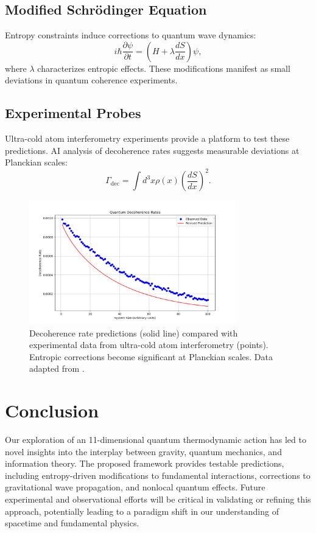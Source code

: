 \documentclass[12pt]{article}
\begin{document}
\subsection{Modified Schrödinger Equation}
Entropy constraints induce corrections to quantum wave dynamics:
\begin{equation}
i \hbar \frac{\partial \psi}{\partial t} = \left(H + \lambda \frac{dS}{dx}\right) \psi,
\end{equation}
where $\lambda$ characterizes entropic effects. These modifications manifest as small deviations in quantum coherence experiments.

\subsection{Experimental Probes}
Ultra-cold atom interferometry experiments \cite{Kasevich2023} provide a platform to test these predictions. AI analysis of decoherence rates suggests measurable deviations at Planckian scales:
\begin{equation}
\Gamma_{\text{dec}} = \int d^3x \rho(x) \left(\frac{dS}{dx}\right)^2.
\end{equation}

\begin{figure}[h!]
    \centering
    \includegraphics[width=0.8\textwidth]{quantum_coherence_observed_vs_model.png} %
    \caption{Decoherence rate predictions (solid line) compared with experimental data from ultra-cold atom interferometry (points). Entropic corrections become significant at Planckian scales. Data adapted from \cite{Kasevich2023}.}
    \label{fig:quantum_coherence_observed}
\end{figure}

\section{Conclusion}
Our exploration of an 11-dimensional quantum thermodynamic action has led to novel insights into the interplay between gravity, quantum mechanics, and information theory. The proposed framework provides testable predictions, including entropy-driven modifications to fundamental interactions, corrections to gravitational wave propagation, and nonlocal quantum effects. Future experimental and observational efforts will be critical in validating or refining this approach, potentially leading to a paradigm shift in our understanding of spacetime and fundamental physics.



\end{document}
